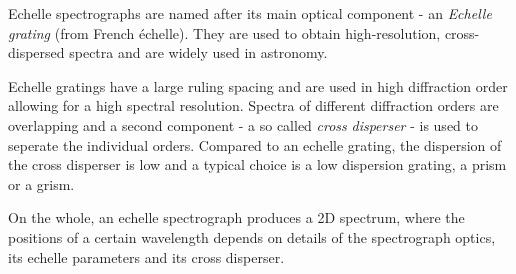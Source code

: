 Echelle spectrographs are named after its main optical component -\/ an {\itshape Echelle} {\itshape grating} (from French échelle). They are used to obtain high-\/resolution, cross-\/dispersed spectra and are widely used in astronomy.

Echelle gratings have a large ruling spacing and are used in high diffraction order allowing for a high spectral resolution. Spectra of different diffraction orders are overlapping and a second component -\/ a so called {\itshape cross} {\itshape disperser} -\/ is used to seperate the individual orders. Compared to an echelle grating, the dispersion of the cross disperser is low and a typical choice is a low dispersion grating, a prism or a grism.

On the whole, an echelle spectrograph produces a 2D spectrum, where the positions of a certain wavelength depends on details of the spectrograph optics, its echelle parameters and its cross disperser.

 